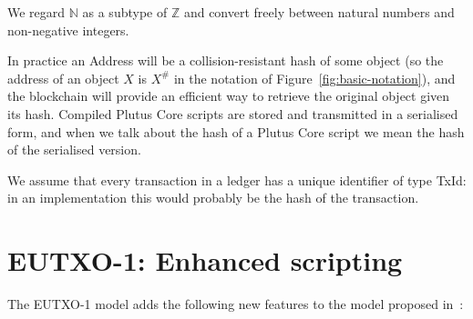 \documentclass[a4paper]{article}
\newcommand{\s}{\textsf}  %
\newcommand\N{\ensuremath{\mathbb{N}}}
\newcommand\Z{\ensuremath{\mathbb{Z}}}
\begin{document}
\noindent We regard $\N$ as a subtype of $\Z$ and convert freely between
natural numbers and non-negative integers.

\medskip
\noindent In practice an \textsf{Address} will be a
collision-resistant hash of some object (so the address of an object
$X$ is $X^{\#}$ in the notation of Figure~\ref{fig:basic-notation}),
and the blockchain will provide an efficient way to retrieve the
original object given its hash.  Compiled Plutus Core scripts are
stored and transmitted in a serialised form, and when we talk about
the hash of a Plutus Core script we mean the hash of the serialised
version.


\medskip
\noindent We assume that every transaction in a ledger has a unique identifier
of type \s{TxId}: in an implementation this would probably be the
hash of the transaction.





\section{EUTXO-1: Enhanced scripting}
\label{sec:eutxo-1}
The EUTXO-1 model adds the following new features to the model 
proposed in~\citep{Zahnentferner18-UTxO}:
\end{document}
